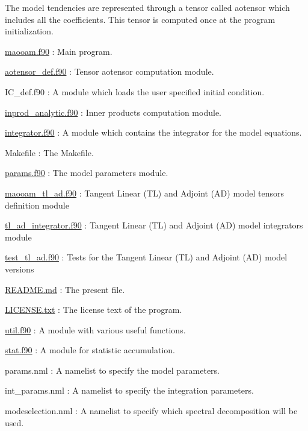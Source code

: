 The model tendencies are represented through a tensor called aotensor which includes all the coefficients. This tensor is computed once at the program initialization.


\begin{DoxyItemize}
\item \hyperlink{maooam_8f90}{maooam.\-f90} \-: Main program.
\item \hyperlink{aotensor__def_8f90}{aotensor\-\_\-def.\-f90} \-: Tensor aotensor computation module.
\item I\-C\-\_\-def.\-f90 \-: A module which loads the user specified initial condition.
\item \hyperlink{inprod__analytic_8f90}{inprod\-\_\-analytic.\-f90} \-: Inner products computation module.
\item \hyperlink{integrator_8f90}{integrator.\-f90} \-: A module which contains the integrator for the model equations.
\item Makefile \-: The Makefile.
\item \hyperlink{params_8f90}{params.\-f90} \-: The model parameters module.
\item \hyperlink{maooam__tl__ad_8f90}{maooam\-\_\-tl\-\_\-ad.\-f90} \-: Tangent Linear (T\-L) and Adjoint (A\-D) model tensors definition module
\item \hyperlink{tl__ad__integrator_8f90}{tl\-\_\-ad\-\_\-integrator.\-f90} \-: Tangent Linear (T\-L) and Adjoint (A\-D) model integrators module
\item \hyperlink{test__tl__ad_8f90}{test\-\_\-tl\-\_\-ad.\-f90} \-: Tests for the Tangent Linear (T\-L) and Adjoint (A\-D) model versions
\item \hyperlink{README_8md}{R\-E\-A\-D\-M\-E.\-md} \-: The present file.
\item \hyperlink{LICENSE_8txt}{L\-I\-C\-E\-N\-S\-E.\-txt} \-: The license text of the program.
\item \hyperlink{util_8f90}{util.\-f90} \-: A module with various useful functions.
\item \hyperlink{stat_8f90}{stat.\-f90} \-: A module for statistic accumulation.
\item params.\-nml \-: A namelist to specify the model parameters.
\item int\-\_\-params.\-nml \-: A namelist to specify the integration parameters.
\item modeselection.\-nml \-: A namelist to specify which spectral decomposition will be used.
\end{DoxyItemize}

